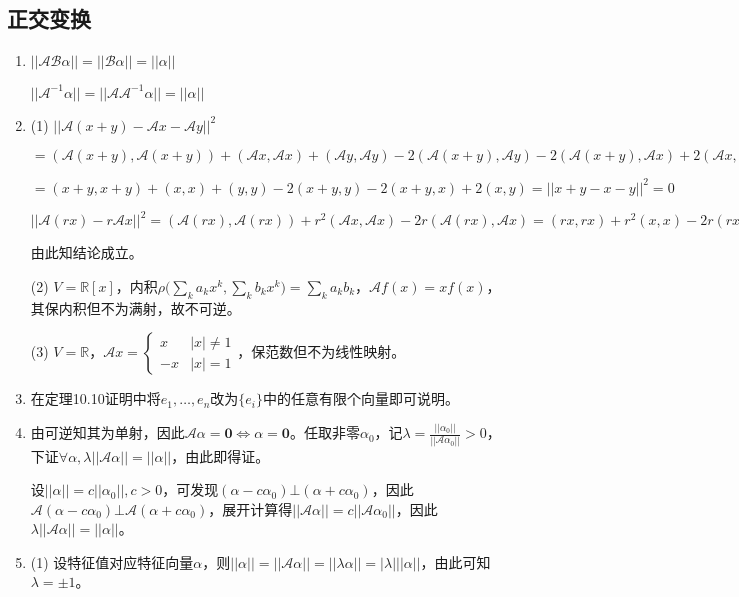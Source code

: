 \documentclass[a4paper,UTF8,fontset=windows]{ctexart}
\begin{document}
\subsection{正交变换}
\begin{enumerate}
\item
$||\mathcal{A}\mathcal{B}\alpha||=||\mathcal{B}\alpha||=||\alpha||$

$||\mathcal{A}^{-1}\alpha||=||\mathcal{A}\mathcal{A}^{-1}\alpha||=||\alpha||$

\item
(1) $||\mathcal{A}(x+y)-\mathcal{A}x-\mathcal{A}y||^2$

$=(\mathcal{A}(x+y),\mathcal{A}(x+y))+(\mathcal{A}x,\mathcal{A}x)+(\mathcal{A}y,\mathcal{A}y)-2(\mathcal{A}(x+y),\mathcal{A}y)-2(\mathcal{A}(x+y),\mathcal{A}x)+2(\mathcal{A}x,\mathcal{A}y)$

$=(x+y,x+y)+(x,x)+(y,y)-2(x+y,y)-2(x+y,x)+2(x,y)=||x+y-x-y||^2=0$

$||\mathcal{A}(rx)-r\mathcal{A}x||^2=(\mathcal{A}(rx),\mathcal{A}(rx))+r^2(\mathcal{A}x,\mathcal{A}x)-2r(\mathcal{A}(rx),\mathcal{A}x)=(rx,rx)+r^2(x,x)-2r(rx,x)=0$

由此知结论成立。

(2) $V=\mathbb{R}[x]$，内积$\rho\bigg(\sum_ka_kx^k,\sum_kb_kx^k\bigg)=\sum_ka_kb_k$，$\mathcal{A}f(x)=xf(x)$，其保内积但不为满射，故不可逆。

(3) $V=\mathbb{R}$，$\mathcal{A}x=\begin{cases}x&|x|\ne1\\-x&|x|=1\end{cases}$，保范数但不为线性映射。

\item
在定理10.10证明中将$e_1,\dots,e_n$改为$\{e_i\}$中的任意有限个向量即可说明。

\item
由可逆知其为单射，因此$\mathcal{A}\alpha=\mathbf{0}\Leftrightarrow\alpha=\mathbf{0}$。任取非零$\alpha_0$，记$\lambda=\frac{||\alpha_0||}{||\mathcal{A}\alpha_0||}>0$，下证$\forall\alpha,\lambda||\mathcal{A}\alpha||=||\alpha||$，由此即得证。

设$||\alpha||=c||\alpha_0||,c>0$，可发现$(\alpha-c\alpha_0)\bot(\alpha+c\alpha_0)$，因此$\mathcal{A}(\alpha-c\alpha_0)\bot\mathcal{A}(\alpha+c\alpha_0)$，展开计算得$||\mathcal{A}\alpha||=c||\mathcal{A}\alpha_0||$，因此$\lambda||\mathcal{A}\alpha||=||\alpha||$。

\item
(1) 设特征值对应特征向量$\alpha$，则$||\alpha||=||\mathcal{A}\alpha||=||\lambda\alpha||=|\lambda|||\alpha||$，由此可知$\lambda=\pm1$。


\end{enumerate}
\end{document}
